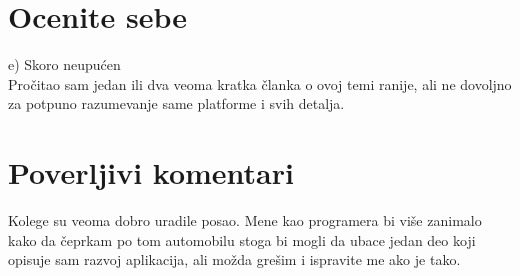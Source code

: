\documentclass[a4paper]{article}
\begin{document}
	\section{Ocenite sebe}
	e) Skoro neupućen\\
	Pročitao sam jedan ili dva veoma kratka članka o ovoj temi ranije, ali ne dovoljno za potpuno razumevanje same platforme i svih detalja.
	
	
	
	\section{Poverljivi komentari}
	Kolege su veoma dobro uradile posao. Mene kao programera bi više zanimalo kako da čeprkam po tom automobilu stoga bi mogli da ubace jedan deo koji opisuje sam razvoj aplikacija, ali možda grešim i ispravite me ako je tako.
	
\end{document}
